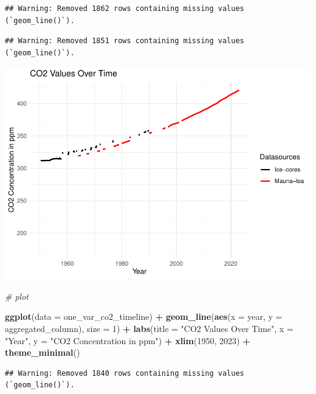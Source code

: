 \documentclass[
]{article}
\newenvironment{Shaded}{\begin{snugshade}}{\end{snugshade}}
\newcommand{\AttributeTok}[1]{\textcolor[rgb]{0.13,0.29,0.53}{#1}}
\newcommand{\CommentTok}[1]{\textcolor[rgb]{0.56,0.35,0.01}{\textit{#1}}}
\newcommand{\DecValTok}[1]{\textcolor[rgb]{0.00,0.00,0.81}{#1}}
\newcommand{\FunctionTok}[1]{\textcolor[rgb]{0.13,0.29,0.53}{\textbf{#1}}}
\newcommand{\NormalTok}[1]{#1}
\newcommand{\SpecialCharTok}[1]{\textcolor[rgb]{0.81,0.36,0.00}{\textbf{#1}}}
\newcommand{\StringTok}[1]{\textcolor[rgb]{0.31,0.60,0.02}{#1}}
\begin{document}
\begin{verbatim}
## Warning: Removed 1862 rows containing missing values (`geom_line()`).
\end{verbatim}

\begin{verbatim}
## Warning: Removed 1851 rows containing missing values (`geom_line()`).
\end{verbatim}

\includegraphics{data_wrangling_files/figure-latex/unnamed-chunk-15-1.pdf}

\begin{Shaded}
\begin{Highlighting}[]
\CommentTok{\# plot}

\FunctionTok{ggplot}\NormalTok{(}\AttributeTok{data =}\NormalTok{ one\_var\_co2\_timeline) }\SpecialCharTok{+}
  \FunctionTok{geom\_line}\NormalTok{(}\FunctionTok{aes}\NormalTok{(}\AttributeTok{x =}\NormalTok{ year, }\AttributeTok{y =}\NormalTok{ aggregated\_column), }\AttributeTok{size =} \DecValTok{1}\NormalTok{) }\SpecialCharTok{+}
  \FunctionTok{labs}\NormalTok{(}\AttributeTok{title =} \StringTok{"CO2 Values Over Time"}\NormalTok{,}
       \AttributeTok{x =} \StringTok{"Year"}\NormalTok{,}
       \AttributeTok{y =} \StringTok{"CO2 Concentration in ppm"}\NormalTok{) }\SpecialCharTok{+}
  \FunctionTok{xlim}\NormalTok{(}\DecValTok{1950}\NormalTok{, }\DecValTok{2023}\NormalTok{) }\SpecialCharTok{+}
  \FunctionTok{theme\_minimal}\NormalTok{()}
\end{Highlighting}
\end{Shaded}

\begin{verbatim}
## Warning: Removed 1840 rows containing missing values (`geom_line()`).
\end{verbatim}
\end{document}
